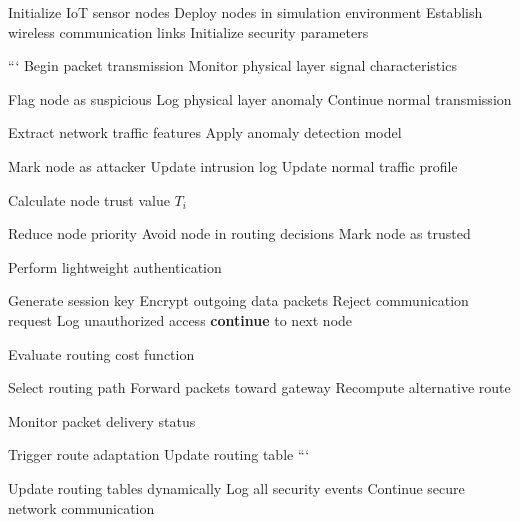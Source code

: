 \documentclass[a4paper,fleqn]{cas-dc}
\numberwithin{equation}{section}
\begin{document}
\begin{algorithm}
\caption{Cross-Layer Security Optimization Algorithm }
\begin{algorithmic}[1]

\STATE Initialize IoT sensor nodes
\STATE Deploy nodes in simulation environment
\STATE Establish wireless communication links
\STATE Initialize security parameters


```
\STATE Begin packet transmission
\STATE Monitor physical layer signal characteristics

    \STATE Flag node as suspicious
    \STATE Log physical layer anomaly
\ELSE
    \STATE Continue normal transmission
\ENDIF

\STATE Extract network traffic features
\STATE Apply anomaly detection model

    \STATE Mark node as attacker
    \STATE Update intrusion log
\ELSE
    \STATE Update normal traffic profile
\ENDIF

\STATE Calculate node trust value $T_i$

    \STATE Reduce node priority
    \STATE Avoid node in routing decisions
\ELSE
    \STATE Mark node as trusted
\ENDIF

\STATE Perform lightweight authentication

    \STATE Generate session key
    \STATE Encrypt outgoing data packets
\ELSE
    \STATE Reject communication request
    \STATE Log unauthorized access
    \STATE \textbf{continue} to next node
\ENDIF

\STATE Evaluate routing cost function

    \STATE Select routing path
    \STATE Forward packets toward gateway
\ELSE
    \STATE Recompute alternative route
\ENDIF

\STATE Monitor packet delivery status

    \STATE Trigger route adaptation
    \STATE Update routing table
\ENDIF
```

\ENDFOR

\STATE Update routing tables dynamically
\STATE Log all security events
\STATE Continue secure network communication

\end{algorithmic}
\end{algorithm}
\end{document}

